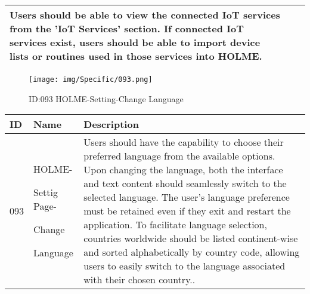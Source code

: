\documentclass[conference]{IEEEtran}
\begin{document}
\begin{enumerate}
\begin{table}[h]
\begin{tabular}{|p{1cm}|p{1.8cm}|p{5.0cm}|}
       Users should be able to view the connected IoT services from the 'IoT Services' section. 
If connected IoT services exist, users should be able to import device lists or routines used in those services into HOLME.
         \\ \hline
    \end{tabular}
\end{table}
\begin{figure}[h]
\centering                                         
\texttt{[image: img/Specific/093.png]}
\caption{ID:093 HOLME-Setting-Change Language}
\end{figure}
\begin{table}[h]
\def\arraystretch{1.2} \small
    \begin{tabular}{|p{1cm}|p{1.8cm}|p{5.0cm}|}
        \hline
        ID & Name & Description\\ \hline
         093 \par  & HOLME-\par Settig Page- \par Change \par Language&Users should have the capability to choose their preferred language from the available options. Upon changing the language, both the interface and text content should seamlessly switch to the selected language. The user's language preference must be retained even if they exit and restart the application. To facilitate language selection, countries worldwide should be listed continent-wise and sorted alphabetically by country code, allowing users to easily switch to the language associated with their chosen country..
         \\ \hline
    \end{tabular}
\end{table}
\clearpage


\end{enumerate}
\end{document}
